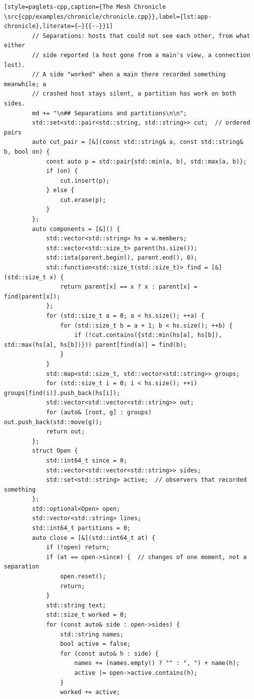 \begin{lstlisting}[style=paglets-cpp,caption={The Mesh Chronicle \src{cpp/examples/chronicle/chronicle.cpp}},label={lst:app-chronicle},literate={–}{{--}}1]
        // Separations: hosts that could not see each other, from what either
        // side reported (a host gone from a main's view, a connection lost).
        // A side "worked" when a main there recorded something meanwhile; a
        // crashed host stays silent, a partition has work on both sides.
        md += "\n## Separations and partitions\n\n";
        std::set<std::pair<std::string, std::string>> cut;  // ordered pairs
        auto cut_pair = [&](const std::string& a, const std::string& b, bool on) {
            const auto p = std::pair{std::min(a, b), std::max(a, b)};
            if (on) {
                cut.insert(p);
            } else {
                cut.erase(p);
            }
        };
        auto components = [&]() {
            std::vector<std::string> hs = w.members;
            std::vector<std::size_t> parent(hs.size());
            std::iota(parent.begin(), parent.end(), 0);
            std::function<std::size_t(std::size_t)> find = [&](std::size_t x) {
                return parent[x] == x ? x : parent[x] = find(parent[x]);
            };
            for (std::size_t a = 0; a < hs.size(); ++a) {
                for (std::size_t b = a + 1; b < hs.size(); ++b) {
                    if (!cut.contains({std::min(hs[a], hs[b]), std::max(hs[a], hs[b])})) parent[find(a)] = find(b);
                }
            }
            std::map<std::size_t, std::vector<std::string>> groups;
            for (std::size_t i = 0; i < hs.size(); ++i) groups[find(i)].push_back(hs[i]);
            std::vector<std::vector<std::string>> out;
            for (auto& [root, g] : groups) out.push_back(std::move(g));
            return out;
        };
        struct Open {
            std::int64_t since = 0;
            std::vector<std::vector<std::string>> sides;
            std::set<std::string> active;  // observers that recorded something
        };
        std::optional<Open> open;
        std::vector<std::string> lines;
        std::int64_t partitions = 0;
        auto close = [&](std::int64_t at) {
            if (!open) return;
            if (at == open->since) {  // changes of one moment, not a separation
                open.reset();
                return;
            }
            std::string text;
            std::size_t worked = 0;
            for (const auto& side : open->sides) {
                std::string names;
                bool active = false;
                for (const auto& h : side) {
                    names += (names.empty() ? "" : ", ") + name(h);
                    active |= open->active.contains(h);
                }
                worked += active;

\end{lstlisting}
